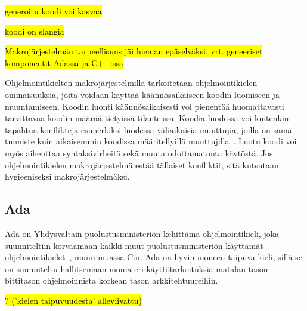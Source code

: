 \hl{generoitu koodi voi kasvaa}

\hl{koodi on slangia}

\hl{Makrojärjestelmän tarpeellisuus jäi hieman epäselväksi, vrt. geneeriset
komponentit Adassa ja C++:ssa}

Ohjelmointikielten makrojärjestelmillä tarkoitetaan ohjelmointikielen
ominaisuuksia, joita voidaan käyttää käännösaikaiseen koodin luomiseen ja
muuntamiseen. Koodin luonti käännösaikaisesti voi pienentää huomattavasti
tarvittavaa koodin määrää tietyissä tilanteissa\citationneeded. Koodia luodessa voi kuitenkin 
tapahtua konflikteja esimerkiksi luodessa väliaikaisia muuttujia, joilla on
sama tunniste kuin aikaisemmin koodissa määritellyillä
muuttujilla~\citep{macrohygiene}. Luotu koodi voi myös aiheuttaa
syntaksivirheitä sekä muuta odottamatonta käytöstä. Jos ohjelmointikielen
makrojärjestelmä estää tällaiset konfliktit, sitä kutsutaan hygieeniseksi
makrojärjestelmäksi.

%

%

\subsection{Ada}

Ada on Yhdysvaltain puolustusministeriön kehittämä ohjelmointikieli, joka
suunniteltiin korvaamaan kaikki muut puolustusministeriön käyttämät
ohjelmointikielet~\citep{adahistory}, muun muassa C:n. Ada on hyvin moneen
taipuva kieli, sillä se on suunniteltu hallitsemaan monia eri
käyttötarkoituksia matalan tason bittitason ohjelmoinnista korkean tason
arkkitehtuureihin.

\hl{? ('kielen taipuvuudesta' alleviivattu)}

